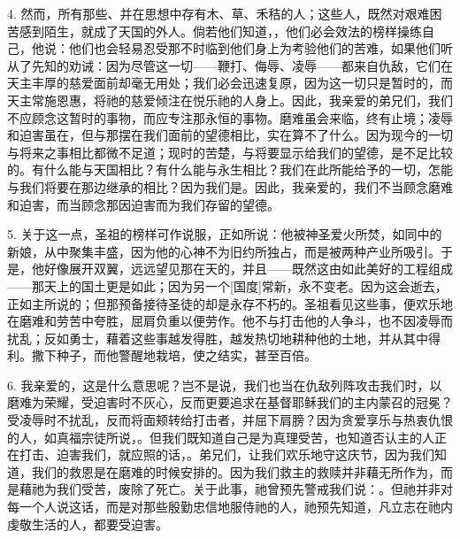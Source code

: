 4. 然而，所有那些、并在思想中存有木、草、禾秸的人；这些人，既然对艰难困苦感到陌生，就成了天国的外人。倘若他们知道，，他们必会效法的榜样操练自己，他说：他们也会轻易忍受那不时临到他们身上为考验他们的苦难，如果他们听从了先知的劝诫：因为尽管这一切——鞭打、侮辱、凌辱——都来自仇敌，它们在天主丰厚的慈爱面前却毫无用处；我们必会迅速复原，因为这一切只是暂时的，而天主常施恩惠，将祂的慈爱倾注在悦乐祂的人身上。因此，我亲爱的弟兄们，我们不应顾念这暂时的事物，而应专注那永恒的事物。磨难虽会来临，终有止境；凌辱和迫害虽在，但与那摆在我们面前的望德相比，实在算不了什么。因为现今的一切与将来之事相比都微不足道；现时的苦楚，与将要显示给我们的望德，是不足比较的。有什么能与天国相比？有什么能与永生相比？我们在此所能给予的一切，怎能与我们将要在那边继承的相比？因为我们是。因此，我亲爱的，我们不当顾念磨难和迫害，而当顾念那因迫害而为我们存留的望德。\par

5. 关于这一点，圣祖的榜样可作说服，正如所说：他被神圣爱火所焚，如同中的新娘，从中聚集丰盛，因为他的心神不为旧约所独占，而是被两种产业所吸引。于是，他好像展开双翼，远远望见那在天的，并且——既然这由如此美好的工程组成——那天上的国土更是如此；因为另一个[国度]常新，永不变老。因为这会逝去，正如主所说的；但那预备接待圣徒的却是永存不朽的。圣祖看见这些事，便欢乐地在磨难和劳苦中夸胜，屈肩负重以便劳作。他不与打击他的人争斗，也不因凌辱而扰乱；反如勇士，藉着这些事越发得胜，越发热切地耕种他的土地，并从其中得利。撒下种子，而他警醒地栽培，使之结实，甚至百倍。\par

6. 我亲爱的，这是什么意思呢？岂不是说，我们也当在仇敌列阵攻击我们时，以磨难为荣耀，受迫害时不灰心，反而更要追求在基督耶稣我们的主内蒙召的冠冕？受凌辱时不扰乱，反而将面颊转给打击者，并屈下肩膀？因为贪爱享乐与热衷仇恨的人，如真福宗徒所说，。但我们既知道自己是为真理受苦，也知道否认主的人正在打击、迫害我们，就应照的话，。弟兄们，让我们欢乐地守这庆节，因为我们知道，我们的救恩是在磨难的时候安排的。因为我们救主的救赎并非藉无所作为，而是藉祂为我们受苦，废除了死亡。关于此事，祂曾预先警戒我们说：。但祂并非对每一个人说这话，而是对那些殷勤忠信地服侍祂的人，祂预先知道，凡立志在祂内虔敬生活的人，都要受迫害。\par

